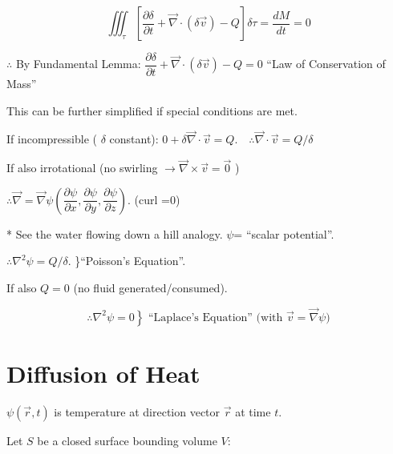 \documentclass{report}
\begin{document}
$$
\displaystyle\iiint_{\tau}\left[\dfrac{\partial \delta}{\partial t}+\vec{\nabla} \cdot(\delta \vec{v})-Q\right] \delta \tau=\dfrac{d M}{d t}=0
$$

$\therefore$ By Fundamental Lemma: $\dfrac{\partial \delta}{\partial t}+\vec{\nabla} \cdot(\delta \vec{v})-Q=0$ ``Law of Conservation of Mass''

This can be further simplified if special conditions are met.

If incompressible ( $\delta$ constant): $0+\delta \vec{\nabla} \cdot \vec{v}=Q. \quad \therefore \vec{\nabla} \cdot \vec{v}=Q / \delta$

If also irrotational (no swirling $\rightarrow \vec{\nabla} \times \vec{v}=\overrightarrow{0}$ )

$\therefore \vec{\nabla}=\vec{\nabla} \psi\left(\dfrac{\partial \psi}{\partial x}, \dfrac{\partial \psi}{\partial y}, \dfrac{\partial \psi}{\partial z}\right).$ \quad  (curl =0)

* See the water flowing down a hill analogy. $\psi$= ``scalar potential''.


$\therefore \nabla^{2} \psi=Q / \delta$. \}``Poisson's Equation''.

If also $Q=0$ (no fluid generated/consumed).

$$
\left.\therefore \nabla^{2} \psi=0\right\} \text { ``Laplace's Equation'' (with } \vec{v}=\vec{\nabla} \psi)
$$

\section{Diffusion of Heat} 

$\psi(\vec{r}, t)$ is temperature at direction vector $\vec{r}$ at time $t$.

Let $S$ be a closed surface bounding volume $V$:
\end{document}
